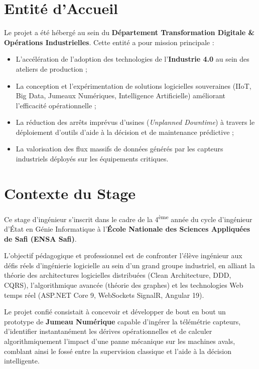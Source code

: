 \section{Entité d'Accueil}
Le projet a été hébergé au sein du \textbf{Département Transformation Digitale \& Opérations Industrielles}. Cette entité a pour mission principale :
\begin{itemize}
    \item L'accélération de l'adoption des technologies de l'\textbf{Industrie 4.0} au sein des ateliers de production ;
    \item La conception et l'expérimentation de solutions logicielles souveraines (IIoT, Big Data, Jumeaux Numériques, Intelligence Artificielle) améliorant l'efficacité opérationnelle ;
    \item La réduction des arrêts imprévus d'usines (\textit{Unplanned Downtime}) à travers le déploiement d'outils d'aide à la décision et de maintenance prédictive ;
    \item La valorisation des flux massifs de données générés par les capteurs industriels déployés sur les équipements critiques.
\end{itemize}

\section{Contexte du Stage}
Ce stage d'ingénieur s'inscrit dans le cadre de la 4\textsuperscript{ème} année du cycle d'ingénieur d'État en Génie Informatique à l'\textbf{École Nationale des Sciences Appliquées de Safi (ENSA Safi)}.

L'objectif pédagogique et professionnel est de confronter l'élève ingénieur aux défis réels d'ingénierie logicielle au sein d'un grand groupe industriel, en alliant la théorie des architectures logicielles distribuées (Clean Architecture, DDD, CQRS), l'algorithmique avancée (théorie des graphes) et les technologies Web temps réel (ASP.NET Core 9, WebSockets SignalR, Angular 19).

Le projet confié consistait à concevoir et développer de bout en bout un prototype de \textbf{Jumeau Numérique} capable d'ingérer la télémétrie capteurs, d'identifier instantanément les dérives opérationnelles et de calculer algorithmiquement l'impact d'une panne mécanique sur les machines avals, comblant ainsi le fossé entre la supervision classique et l'aide à la décision intelligente.